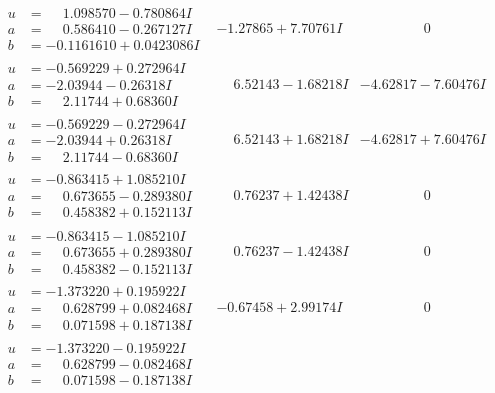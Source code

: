 \documentclass[1p]{elsarticle_modified}
\theoremstyle{definition}
\begin{document}
$$\begin{array}{c|c|c}
\begin{aligned}
u &= \phantom{-}1.098570 - 0.780864 I \\
a &= \phantom{-}0.586410 - 0.267127 I \\
b &= -0.1161610 + 0.0423086 I\end{aligned}
 & -1.27865 + 7.70761 I & \phantom{-0.000000 } 0 \\ \hline\begin{aligned}
u &= -0.569229 + 0.272964 I \\
a &= -2.03944 - 0.26318 I \\
b &= \phantom{-}2.11744 + 0.68360 I\end{aligned}
 & \phantom{-}6.52143 - 1.68218 I & -4.62817 - 7.60476 I \\ \hline\begin{aligned}
u &= -0.569229 - 0.272964 I \\
a &= -2.03944 + 0.26318 I \\
b &= \phantom{-}2.11744 - 0.68360 I\end{aligned}
 & \phantom{-}6.52143 + 1.68218 I & -4.62817 + 7.60476 I \\ \hline\begin{aligned}
u &= -0.863415 + 1.085210 I \\
a &= \phantom{-}0.673655 - 0.289380 I \\
b &= \phantom{-}0.458382 + 0.152113 I\end{aligned}
 & \phantom{-}0.76237 + 1.42438 I & \phantom{-0.000000 } 0 \\ \hline\begin{aligned}
u &= -0.863415 - 1.085210 I \\
a &= \phantom{-}0.673655 + 0.289380 I \\
b &= \phantom{-}0.458382 - 0.152113 I\end{aligned}
 & \phantom{-}0.76237 - 1.42438 I & \phantom{-0.000000 } 0 \\ \hline\begin{aligned}
u &= -1.373220 + 0.195922 I \\
a &= \phantom{-}0.628799 + 0.082468 I \\
b &= \phantom{-}0.071598 + 0.187138 I\end{aligned}
 & -0.67458 + 2.99174 I & \phantom{-0.000000 } 0 \\ \hline\begin{aligned}
u &= -1.373220 - 0.195922 I \\
a &= \phantom{-}0.628799 - 0.082468 I \\
b &= \phantom{-}0.071598 - 0.187138 I\end{aligned}

\end{array}$$
\end{document}
